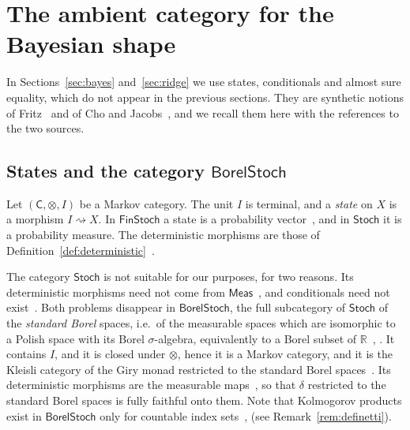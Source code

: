 \documentclass[11pt,a4paper]{article}
\theoremstyle{plain}
\theoremstyle{definition}
\theoremstyle{remark}
\newcommand{\cat}[1]{\mathsf{#1}}
\newcommand{\Meas}{\cat{Meas}}
\newcommand{\Stoch}{\cat{Stoch}}
\newcommand{\FinStoch}{\cat{FinStoch}}
\newcommand{\del}{\delta}
\newcommand{\R}{\mathbb{R}}
\newcommand{\BorelStoch}{\cat{BorelStoch}}
\begin{document}
\section{The ambient category for the Bayesian shape}\label{sec:ambient}

In Sections~\ref{sec:bayes} and~\ref{sec:ridge} we use states, conditionals and
almost sure equality, which do not appear in the previous sections. They are
synthetic notions of Fritz~\cite{fritz_synthetic_2020} and of Cho and
Jacobs~\cite{cho_disintegration_2019}, and we recall them here with the
references to the two sources.

\subsection{States and the category \texorpdfstring{$\BorelStoch$}{BorelStoch}}

Let $(\cat C,\otimes,I)$ be a Markov category. The unit $I$ is terminal, and a
\emph{state} on $X$ is a morphism $I \rightsquigarrow X$. In $\FinStoch$ a
state is a probability vector~\cite[Ex.~2.5]{fritz_synthetic_2020}, and in
$\Stoch$ it is a probability measure. The deterministic morphisms are those of
Definition~\ref{def:deterministic}~\cite[Def.~10.1]{fritz_synthetic_2020}.

The category $\Stoch$ is not suitable for our purposes, for two reasons. Its
deterministic morphisms need not come from
$\Meas$~\cite[Ex.~10.4]{fritz_synthetic_2020}, and conditionals need not
exist~\cite[Ex.~11.3]{fritz_synthetic_2020}. Both problems disappear in
$\BorelStoch$, the full subcategory of $\Stoch$ of the \emph{standard Borel}
spaces, i.e.\ of the measurable spaces which are isomorphic to a Polish space
with its Borel $\sigma$-algebra, equivalently to a Borel subset of
$\R$~\cite[p.~21]{fritz_synthetic_2020},
\cite[p.~12]{cho_disintegration_2019}. It contains $I$, and it is closed under
$\otimes$, hence it is a Markov category, and it is the Kleisli category of the
Giry monad restricted to the standard Borel
spaces~\cite[p.~12]{cho_disintegration_2019}. Its deterministic morphisms are
the measurable maps~\cite[Ex.~10.5]{fritz_synthetic_2020}, so that $\del$
restricted to the standard Borel spaces is fully faithful onto them. Note that
Kolmogorov products exist in $\BorelStoch$ only for countable index
sets~\cite[p.~21]{fritz_synthetic_2020},
\cite[Ex.~3.6]{fritz_rischel_infinite_2020} (see
Remark~\ref{rem:definetti}).
\end{document}
